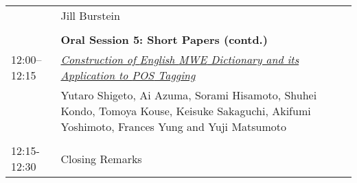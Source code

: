\begin{tabular}{p{20mm}p{138mm}}
         & Jill Burstein \\
\\
 & {\bf Oral Session 5: Short Papers (contd.)} \\
12:00--12:15 & \hyperlink{page.139}{\em Construction of {E}nglish {MWE} Dictionary and its Application to {POS} Tagging}\\
         & Yutaro Shigeto, Ai Azuma, Sorami Hisamoto, Shuhei Kondo, Tomoya Kouse, Keisuke Sakaguchi, Akifumi Yoshimoto, Frances Yung and Yuji Matsumoto \\
\\
12:15-12:30 & Closing Remarks \\
\end{tabular}
